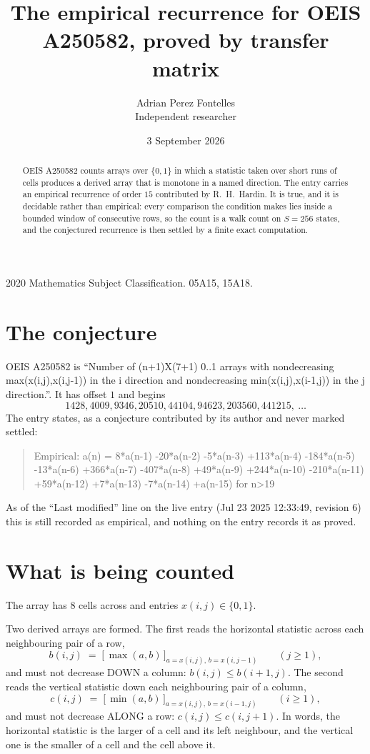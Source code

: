 \documentclass[11pt,a4paper]{article}
\title{The empirical recurrence for OEIS A250582, proved by transfer matrix}
\author{Adrian Perez Fontelles\\ \small Independent researcher}
\date{3 September 2026}
\theoremstyle{plain}
\theoremstyle{definition}
\begin{document}
\maketitle

\begin{abstract}
OEIS A250582 counts arrays over $\{0,1\}$ in which a statistic taken over short runs
of cells produces a derived array that is monotone in a named direction. The entry carries an
empirical recurrence of order $15$ contributed by R.~H.~Hardin. It is true, and it is
decidable rather than empirical: every comparison the condition makes lies inside a bounded
window of consecutive rows, so the count is a walk count on $S=256$ states, and the
conjectured recurrence is then settled by a finite exact computation.
\end{abstract}

\noindent\small 2020 Mathematics Subject Classification. 05A15, 15A18.\normalsize

\section{The conjecture}

OEIS A250582 is ``Number of (n+1)X(7+1) 0..1 arrays with nondecreasing max(x(i,j),x(i,j-1)) in the i direction and nondecreasing min(x(i,j),x(i-1,j)) in the j direction.''. It has offset $1$ and begins
\[
1428, 4009, 9346, 20510, 44104, 94623, 203560, 441215,\ \dots
\]
The entry states, as a conjecture contributed by its author and never marked settled:
\begin{quote}
Empirical: a(n) = 8*a(n-1) -20*a(n-2) -5*a(n-3) +113*a(n-4) -184*a(n-5) -13*a(n-6) +366*a(n-7) -407*a(n-8) +49*a(n-9) +244*a(n-10) -210*a(n-11) +59*a(n-12) +7*a(n-13) -7*a(n-14) +a(n-15) for n>19
\end{quote}
As of the ``Last modified'' line on the live entry (Jul 23 2025 12:33:49, revision 6) this is still
recorded as empirical, and nothing on the entry records it as proved.

\section{What is being counted}

The array has $8$ cells across and entries $x(i,j)\in\{0,1\}$.

Two derived arrays are formed. The first reads the horizontal statistic across each
neighbouring pair of a row,
\[
b(i,j)\;=\;\bigl[\,\max(a,b)\,\bigr]_{a=x(i,j),\,b=x(i,j-1)}\qquad (j\ge1),
\]
and must not decrease DOWN a column: $b(i,j)\le b(i{+}1,j)$. The second reads the vertical
statistic down each neighbouring pair of a column,
\[
c(i,j)\;=\;\bigl[\,\min(a,b)\,\bigr]_{a=x(i,j),\,b=x(i{-}1,j)}\qquad (i\ge1),
\]
and must not decrease ALONG a row: $c(i,j)\le c(i,j{+}1)$. In words, the horizontal statistic
is the larger of a cell and its left neighbour, and the vertical one is
the smaller of a cell and the cell above it.
\end{document}
